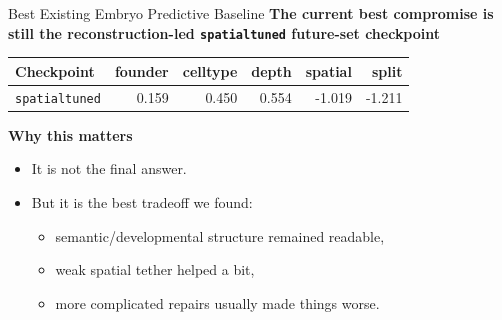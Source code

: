 \documentclass[aspectratio=169,11pt]{beamer}
\begin{document}
\begin{frame}{Best Existing Embryo Predictive Baseline}
\textbf{The current best compromise is still the reconstruction-led \texttt{spatialtuned} future-set checkpoint}

\vspace{0.5em}
\small
\begin{tabular}{lrrrrr}
\toprule
\textbf{Checkpoint} & founder & celltype & depth & spatial & split \\
\midrule
\texttt{spatialtuned} & 0.159 & 0.450 & 0.554 & -1.019 & -1.211 \\
\bottomrule
\end{tabular}

\vspace{0.8em}
\textbf{Why this matters}
\begin{itemize}
    \item It is not the final answer.
    \item But it is the best tradeoff we found:
    \begin{itemize}
        \item semantic/developmental structure remained readable,
        \item weak spatial tether helped a bit,
        \item more complicated repairs usually made things worse.
    \end{itemize}
\end{itemize}
\end{frame}
\end{document}

